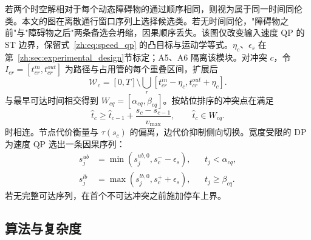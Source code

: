 若两个时空解相对于每个动态障碍物的通过顺序相同，则视为属于同一时间同伦类。本文的图在离散通行窗口序列上选择候选类。若无时间同伦，"障碍物之前"与"障碍物之后"两条备选会坍缩，因果顺序丢失。该图仅改变输入速度 QP 的 ST 边界，保留式~\eqref{zh:eq:speed_qp} 的凸目标与运动学等式。$\eta_c$、$\epsilon_s$ 在第~\ref{zh:sec:experimental_design}节标定；A5、A6 隔离该模块。对冲突 $c$，令 $I_{cr}=[t_{cr}^{in},t_{cr}^{out}]$ 为路径与占用管的每个重叠区间，扩展后
\begin{equation}
 \mathcal{W}_c=[0,T]\setminus\bigcup_r[t_{cr}^{in}-\eta_c,t_{cr}^{out}+\eta_c].
 \label{zh:eq:safe_windows}
\end{equation}
与最早可达时间相交得到 $W_{cq}=[\alpha_{cq},\beta_{cq}]$。按站位排序的冲突点在满足
\begin{equation}
 \hat t_c\geq\hat t_{c-1}+\frac{s_c-s_{c-1}}{v_{\max}},\qquad \hat t_c\in W_{cq}.
 \label{zh:eq:temporal_edge}
\end{equation}
时相连。节点代价衡量与 $\tau(s_c)$ 的偏离，边代价抑制侧向切换。宽度受限的 DP 为速度 QP 选出一条因果序列：
\begin{equation}
 \begin{aligned}
 s_j^{ub}&=\min(s_j^{ub,0},s_c^- -\epsilon_s),&&t_j<\alpha_{cq},\\
 s_j^{lb}&=\max(s_j^{lb,0},s_c^+ +\epsilon_s),&&t_j\geq\beta_{cq}.
 \end{aligned}
 \label{zh:eq:window_to_st}
\end{equation}
若无完整可达序列，在首个不可达冲突之前施加停车上界。

\subsection{算法与复杂度}

